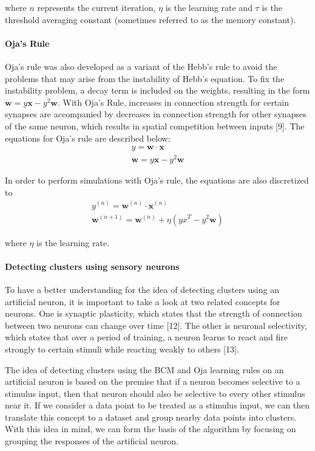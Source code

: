 \documentclass[10pt,twoside]{article}
\begin{document}
\noindent where $n$ represents the current iteration, $\eta$ is the learning rate and $\tau$ is the threshold averaging constant (sometimes referred to as the memory constant).
 

\paragraph*{Oja's  Rule}

Oja's rule was also developed as a variant of the Hebb's rule to avoid the
problems that may arise from the instability of Hebb's equation. To fix the instability problem, a decay term is
included on the weights, resulting in the form $\mathbf{\dot w} = y\mathbf{x} - y^2\mathbf{w}$.
With Oja's Rule, increases in connection strength for certain synapses are accompanied by
decreases in connection strength for other synapses of the same neuron, which 
results in spatial competition between inputs [9].
The equations for Oja's rule are described below:
\begin{align}			
			y = \mathbf{w} \cdot \mathbf{x} \\
			\mathbf{\dot w} = y\mathbf{x} - y^2\mathbf{w}
\end{align}

\noindent In order to perform simulations with Oja's rule, the equations are also discretized to
\begin{align}
			y^{(n)} = \mathbf{w} ^{(n)} \cdot \mathbf{x} ^{(n)} \\
			\mathbf{w}^{(n+1)}= \mathbf{w}^{(n)} + \eta (yx^T -  y^2\mathbf{ w}) 
\end{align}

\noindent where $\eta$ is the learning rate.

\paragraph*{Detecting clusters using sensory neurons}

To have a better understanding for the idea of detecting
clusters using an artificial neuron, it is important to take
a look at two related concepts for neurons. One is synaptic
plasticity, which states that the strength of connection between
two neurons can change over time [12]. The other is neuronal selectivity,
which states that over a period of training, a neuron learns to
react and fire strongly to certain stimuli while reacting weakly to others [13]. 

The idea of detecting clusters using 
the BCM and Oja learning rules on an artificial neuron is
based on the premise that if a neuron becomes selective
to a stimulus input, then that neuron should also be
selective to every other stimulus near it. If we consider 
a data point to be treated as a stimulus input, we can then translate 
this concept to a dataset and group nearby data points into clusters. 
With this idea in mind, we can form the basis of the
algorithm by focusing on grouping the responses of the
artificial neuron.
\end{document}

